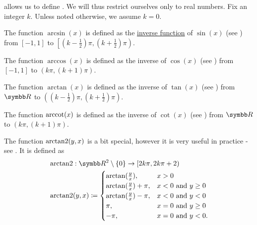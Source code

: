 \begin{definition}\label{def:inverse_trigonometric_functions}
   allows us to define . We will thus restrict ourselves only to real numbers. Fix an integer \( k \). Unless noted otherwise, we assume \( k = 0 \).

  \begin{DefEnum}
     The  function \( \arcsin(x) \) is defined as the \hyperref[def:function/inverse]{inverse function} of \( \sin(x) \) (see ) from \( [-1, 1] \) to \( \left[(k - \tfrac 1 2) \pi, (k + \tfrac 1 2) \pi \right) \).

     The  function \( \arccos(x) \) is defined as the inverse of \( \cos(x) \) (see ) from \( [-1, 1] \) to \( (k\pi, (k + 1)\pi) \).

     The  function \( \arctan(x) \) is defined as the inverse of \( \tan(x) \) (see ) from \( \BR \) to \( \left((k - \tfrac 1 2) \pi, (k + \tfrac 1 2) \pi \right) \).

     The  function \( \operatorname{arccot}(x) \) is defined as the inverse of \( \cot(x) \) (see ) from \( \BR \) to \( (k\pi, (k + 1)\pi) \).

     The  function \( \operatorname{arctan2}(y, x) \) is a bit special, however it is very useful in practice - see . It is defined as
    \begin{align*}
       & \ATanTwo: \BR^2 \setminus \{ 0 \} \to [2k\pi, 2k\pi + 2) \\
       & \ATanTwo(y, x) \coloneqq \begin{cases}
        \arctan(\tfrac y x),       & x > 0                \\
        \arctan(\tfrac y x) + \pi, & x < 0 \Tand y \geq 0 \\
        \arctan(\tfrac y x) - \pi, & x < 0 \Tand y < 0    \\
        \pi,                       & x = 0 \Tand y \geq 0 \\
        -\pi,                      & x = 0 \Tand y < 0.
      \end{cases}
    \end{align*}
  \end{DefEnum}
\end{definition}


